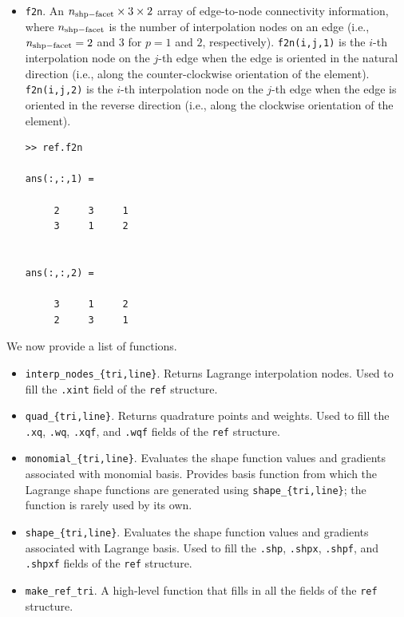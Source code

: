 \documentclass[openany,preprint,11pt]{article}
\begin{document}
\begin{itemize}
\item \texttt{f2n}. An $n_{\rm shp-facet} \times 3 \times 2$ array of edge-to-node connectivity information, where $n_{\rm shp-facet}$ is the number of interpolation nodes on an edge (i.e., $n_{\rm shp-facet} = 2$ and $3$ for $p=1$ and $2$, respectively). \texttt{f2n(i,j,1)} is the $i$-th interpolation node on the $j$-th edge when the edge is oriented in the natural direction (i.e., along the counter-clockwise orientation of the element). \texttt{f2n(i,j,2)} is the $i$-th interpolation node on the $j$-th edge when the edge is oriented in the reverse direction (i.e., along the clockwise orientation of the element).
\begin{verbatim}
>> ref.f2n

ans(:,:,1) =

     2     3     1
     3     1     2


ans(:,:,2) =

     3     1     2
     2     3     1
\end{verbatim}
\end{itemize}
We now provide a list of functions.
\begin{itemize}
\item \texttt{interp\_nodes\_\{tri,line\}}.  Returns Lagrange interpolation nodes.  Used to fill the \texttt{.xint} field of the \texttt{ref} structure.
\item \texttt{quad\_\{tri,line\}}.  Returns quadrature points and weights.  Used to fill the \texttt{.xq}, \texttt{.wq}, \texttt{.xqf}, and \texttt{.wqf} fields of the \texttt{ref} structure.
\item \texttt{monomial\_\{tri,line\}}.  Evaluates the shape function values and gradients associated with monomial basis.  Provides basis function from which the Lagrange shape functions are generated using \texttt{shape\_\{tri,line\}}; the function is rarely used by its own.
\item \texttt{shape\_\{tri,line\}}.  Evaluates the shape function values and gradients associated with Lagrange basis.  Used to fill the \texttt{.shp}, \texttt{.shpx}, \texttt{.shpf}, and \texttt{.shpxf} fields of the \texttt{ref} structure.
\item \texttt{make\_ref\_tri}.  A high-level function that fills in all the fields of the \texttt{ref} structure.
\end{itemize}
\end{document}
